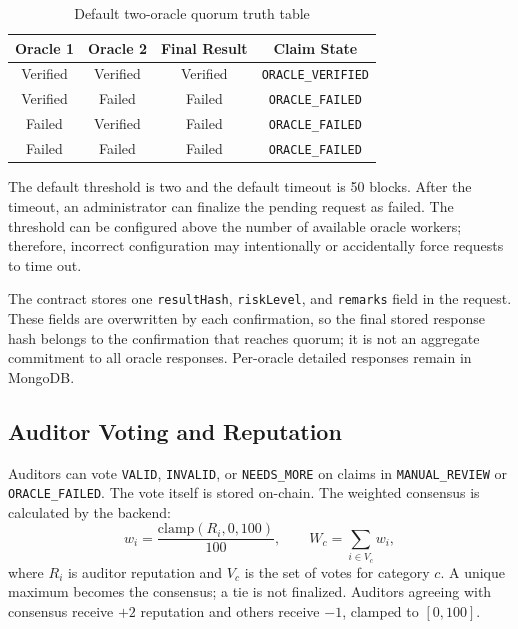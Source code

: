 \begin{table}[htbp]
\centering
\caption{Default two-oracle quorum truth table}
\label{tab:oracle_truth_table}
\begin{tabular}{|c|c|c|c|}
\hline
\textbf{Oracle 1} & \textbf{Oracle 2} & \textbf{Final Result} &
\textbf{Claim State} \\
\hline
Verified & Verified & Verified & \texttt{ORACLE\_VERIFIED} \\
\hline
Verified & Failed & Failed & \texttt{ORACLE\_FAILED} \\
\hline
Failed & Verified & Failed & \texttt{ORACLE\_FAILED} \\
\hline
Failed & Failed & Failed & \texttt{ORACLE\_FAILED} \\
\hline
\end{tabular}
\end{table}

The default threshold is two and the default timeout is 50 blocks. After the
timeout, an administrator can finalize the pending request as failed. The
threshold can be configured above the number of available oracle workers;
therefore, incorrect configuration may intentionally or accidentally force
requests to time out.

The contract stores one \texttt{resultHash}, \texttt{riskLevel}, and
\texttt{remarks} field in the request. These fields are overwritten by each
confirmation, so the final stored response hash belongs to the confirmation
that reaches quorum; it is not an aggregate commitment to all oracle responses.
Per-oracle detailed responses remain in MongoDB.

\subsection{Auditor Voting and Reputation}

Auditors can vote \texttt{VALID}, \texttt{INVALID}, or \texttt{NEEDS\_MORE} on
claims in \texttt{MANUAL\_REVIEW} or \texttt{ORACLE\_FAILED}. The vote itself
is stored on-chain. The weighted consensus is calculated by the backend:
\begin{equation}
w_i=\frac{\mathrm{clamp}(R_i,0,100)}{100},
\qquad
W_c=\sum_{i\in V_c}w_i,
\label{eq:weighted_consensus}
\end{equation}
where \(R_i\) is auditor reputation and \(V_c\) is the set of votes for category
\(c\). A unique maximum becomes the consensus; a tie is not finalized.
Auditors agreeing with consensus receive \(+2\) reputation and others receive
\(-1\), clamped to \([0,100]\).

